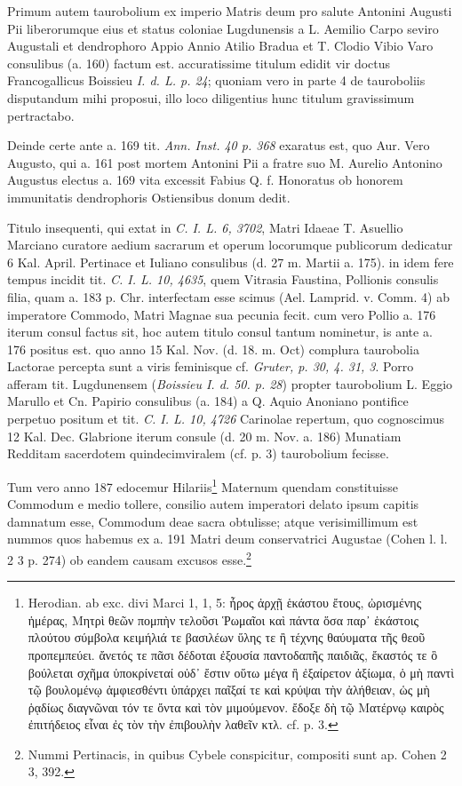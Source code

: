 \documentclass[a4paper, 11pt, oneside, polutonikogreek, german]{article}
\begin{document}
Primum autem taurobolium ex imperio Matris deum pro salute Antonini Augusti Pii liberorumque eius et status coloniae Lugdunensis a L. Aemilio Carpo seviro Augustali et dendrophoro Appio Annio Atilio Bradua et T. Clodio Vibio Varo consulibus (a. 160) factum est. accuratissime titulum edidit vir doctus Francogallicus Boissieu \emph{I. d. L. p. 24}; quoniam vero in parte 4 de tauroboliis disputandum mihi proposui, illo loco diligentius hunc titulum gravissimum pertractabo.

Deinde certe ante a. 169 tit. \emph{Ann. Inst. 40 p. 368} exaratus est, quo Aur. Vero Augusto, qui a. 161 post mortem Antonini Pii a fratre suo M. Aurelio Antonino Augustus electus a. 169 vita excessit Fabius Q. f. Honoratus ob honorem immunitatis dendrophoris Ostiensibus donum dedit.

Titulo insequenti, qui extat in \emph{C. I. L. 6, 3702}, Matri Idaeae T. Asuellio Marciano curatore aedium sacrarum et operum locorumque publicorum dedicatur 6 Kal. April. Pertinace et Iuliano consulibus (d. 27 m. Martii a. 175). in idem fere tempus incidit tit. \emph{C. I. L. 10, 4635}, quem Vitrasia Faustina, Pollionis consulis filia, quam a. 183 p. Chr. interfectam esse scimus (Ael. Lamprid. v. Comm. 4) ab imperatore Commodo, Matri Magnae sua pecunia fecit. cum vero Pollio a. 176 iterum consul factus sit, hoc autem titulo consul tantum nominetur, is ante a. 176 positus est. quo anno 15 Kal. Nov. (d. 18. m. Oct) complura taurobolia Lactorae percepta sunt a viris feminisque cf. \emph{Gruter, p. 30, 4. 31, 3}. Porro afferam tit. Lugdunensem (\emph{Boissieu I. d. 50. p. 28}) propter taurobolium L. Eggio Marullo et Cn. Papirio consulibus (a. 184) a Q. Aquio Anoniano pontifice perpetuo positum et tit. \emph{C. I. L. 10, 4726} Carinolae repertum, quo cognoscimus 12 Kal. Dec. Glabrione iterum consule (d. 20 m. Nov. a. 186) Munatiam Redditam sacerdotem quindecimviralem (cf. p. 3) taurobolium fecisse.

Tum vero anno 187 edocemur Hilariis\footnote{Herodian. ab exc. divi Marci 1, 1, 5: ἦρος ἀρχῇ ἑκάστου ἔτους, ὠρισμένης ἡμέρας, Μητρὶ θεῶν πομπὴν τελοῦσι Ῥωμαῖοι καὶ πάντα ὅσα παρ᾽ ἑκάστοις πλούτου σύμβολα κειμήλιά τε βασιλέων ὕλης τε ἢ τέχνης θαύυματα τῆς θεοῦ προπεμπεύει. ἄνετός τε πᾶσι δέδοται ἐξουσία παντοδαπῆς παιδιᾶς, ἔκαστός τε ὃ βούλεται σχῆμα ὑποκρίνεταί οὐδ᾽ ἔστιν οὕτω μέγα ἢ ἐξαίρετον ἀξίωμα, ὁ μὴ παντὶ τῷ βουλομένῳ ἀμφιεσθέντι ὑπάρχει παῖξαί τε καὶ κρύψαι τὴν ἀλήθειαν, ὡς μὴ ῥᾳδίως διαγνῶναι τόν τε ὄντα καὶ τὸν μιμούμενον. ἔδοξε δὴ τῷ Ματέρνῳ καιρὸς ἐπιτήδειος εἶναι ἐς τὸν τὴν ἐπιβουλὴν λαθεῖν κτλ. cf. p. 3.} Maternum quendam constituisse Commodum e medio tollere, consilio autem imperatori delato ipsum capitis damnatum esse, Commodum deae sacra obtulisse; atque verisimillimum est nummos quos habemus ex a. 191 Matri deum conservatrici Augustae (Cohen l. l. 2 3 p. 274) ob eandem causam excusos esse.\footnote{Nummi Pertinacis, in quibus Cybele conspicitur, compositi sunt ap. Cohen 2 3, 392.}
\end{document}
